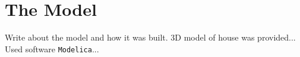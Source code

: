 \chapter{The Model}\label{ch:model} 
Write about the model and how it was built.
3D model of house was provided...
Used software \texttt{Modelica}...
